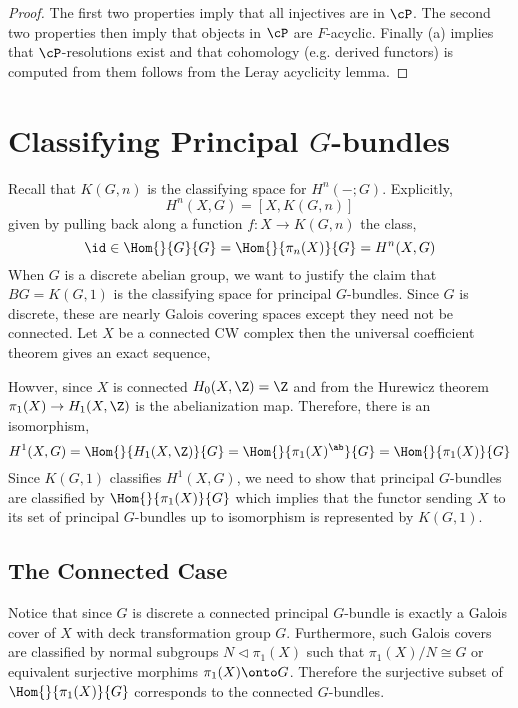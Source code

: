 \documentclass[12pt]{article}
\begin{document}
\begin{proof}
The first two properties imply that all injectives are in $\cP$. The second two properties then imply that objects in $\cP$ are $F$-acyclic. Finally (a) implies that $\cP$-resolutions exist and that cohomology (e.g. derived functors) is computed from them follows from the Leray acyclicity lemma.
\end{proof}

\section{Classifying Principal $G$-bundles}

Recall that $K(G, n)$ is the classifying space for $H^n(- ; G)$. Explicitly,
\[ H^n(X, G) = [X, K(G, n)] \]
given by pulling back along a function $f : X \to K(G,n)$ the class,
\[ \id \in \Hom{}{G}{G} = \Hom{}{\pi_n(X)}{G} = H^n(X, G) \]
When $G$ is a discrete abelian group, we want to justify the claim that $BG = K(G, 1)$ is the classifying space for principal $G$-bundles. Since $G$ is discrete, these are nearly Galois covering spaces except they need not be connected. Let $X$ be a connected CW complex then the universal coefficient theorem gives an exact sequence,
\begin{center}
\end{center} 
Howver, since $X$ is connected $H_0(X, \Z) = \Z$ and from the Hurewicz theorem $\pi_1(X) \to H_1(X, \Z)$ is the abelianization map. Therefore, there is an isomorphism,
\[ H^1(X, G) = \Hom{}{H_1(X, \Z)}{G} = \Hom{}{\pi_1(X)^\ab}{G} = \Hom{}{\pi_1(X)}{G} \]
Since $K(G, 1)$ classifies $H^1(X, G)$, we need to show that principal $G$-bundles are classified by $\Hom{}{\pi_1(X)}{G}$ which implies that the functor sending $X$ to its set of principal $G$-bundles up to isomorphism is represented by $K(G,1)$.


\subsection{The Connected Case}

Notice that since $G$ is discrete a connected principal $G$-bundle is exactly a Galois cover of $X$ with deck transformation group $G$. Furthermore, such Galois covers are classified by normal subgroups $N \triangleleft \pi_1(X)$ such that $\pi_1(X) / N \cong G$ or equivalent surjective morphims $\pi_1(X) \onto G$. Therefore the surjective subset of $\Hom{}{\pi_1(X)}{G}$ corresponds to the connected $G$-bundles.
\end{document}
